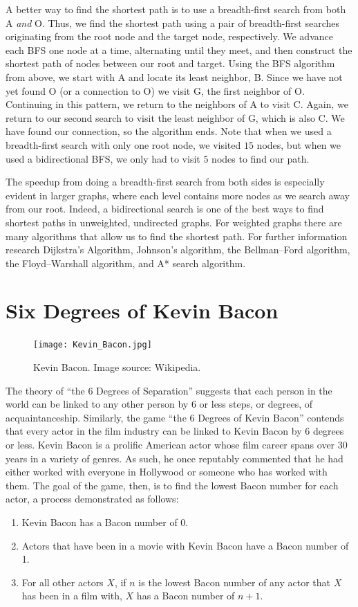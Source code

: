 A better way to find the shortest path is to use a breadth-first search from
both A \emph{and} O. Thus, we find the shortest path using a pair of breadth-first searches originating from the root node and the target node, respectively.
We advance each BFS one node at a time, alternating until they meet, and then 
construct the shortest path of nodes between our root and target.
Using the BFS algorithm from above, we start with A and locate its
least neighbor, B. Since we have not yet found O (or a connection to O) we visit G, 
the first neighbor of O. Continuing in this pattern, we return to the neighbors
of A to visit C. Again, we return to our second search to visit the least neighbor of 
G, which is also C. We have found our connection, so the algorithm ends. Note that when we used a breadth-first
search with only one root node, we visited $15$ nodes, but when we used a bidirectional BFS, we only had to visit $5$ nodes to find our path.

The speedup from doing a breadth-first search from both sides is especially evident in larger graphs, where each level
contains more nodes as we search away from our root. Indeed, a bidirectional search is one of the best ways to find shortest
paths in unweighted, undirected graphs. For weighted graphs there are many algorithms 
that allow us to find the shortest path. For further information research Dijkstra's Algorithm, Johnson's algorithm, the Bellman--Ford algorithm, the Floyd--Warshall algorithm, and A* search algorithm.

\section*{Six Degrees of Kevin Bacon}
\begin{figure}[h]
\texttt{[image: Kevin\_Bacon.jpg]}
\caption{Kevin Bacon.  Image source: Wikipedia.}
\end{figure}

The theory of ``the 6 Degrees of Separation'' suggests that each person in the world can be linked to any other person by 6 or less steps, or degrees, of acquaintanceship.
Similarly, the game ``the 6 Degrees of Kevin Bacon'' contends that every actor in the film industry can be linked to Kevin Bacon by 6 degrees or less. Kevin Bacon
is a prolific American actor whose film career spans over 30 years in a variety of genres. As such, he once reputably commented that he had either worked with everyone in
Hollywood or someone who has worked with them. The goal of the game, then, is to find the lowest Bacon number for each actor, a process demonstrated as follows:
\begin{enumerate}
\item Kevin Bacon has a Bacon number of 0.
\item Actors that have been in a movie with Kevin Bacon have a Bacon number of 1.
\item For all other actors $X$, if $n$ is the lowest Bacon number of any actor that $X$ has been in a film with, $X$ has a Bacon number of $n+1$.
\end{enumerate}


